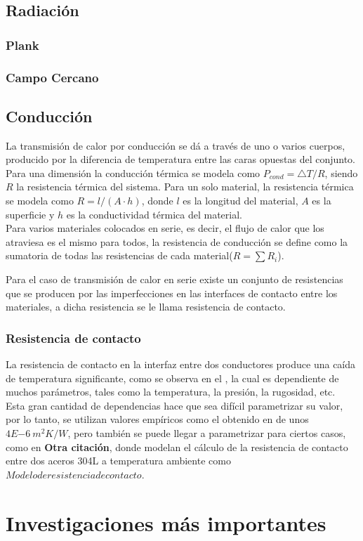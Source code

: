 \subsection{Radiación}

\subsubsection{Plank}
\subsubsection{Campo Cercano}
\subsection{Conducción}
La transmisión de calor por conducción se dá a través de uno o varios cuerpos, producido por la diferencia de temperatura entre las caras opuestas del conjunto. Para una dimensión la conducción térmica se modela como $P_{cond}={\bigtriangleup T}/{R} $, siendo $R$ la resistencia térmica del sistema.
Para un solo material, la resistencia térmica se modela como $R = l/{\left(A\cdot h\right)}$, donde $l$ es la longitud del material, $A$ es la superficie y $h$ es la conductividad térmica del material.\\

Para varios materiales colocados en serie, es decir, el flujo de calor que los atraviesa es el mismo para todos, la resistencia de conducción se define como la sumatoria de todas las resistencias de cada material($R=\sum R_i$).

Para el caso de transmisión de calor en serie existe un conjunto de resistencias que se producen por las imperfecciones en las interfaces de contacto entre los materiales, a dicha resistencia se le llama resistencia de contacto.


\subsubsection{Resistencia de contacto}
La resistencia de contacto en la interfaz entre dos conductores produce una caída de temperatura significante, como se observa en el \cite{noauthor_parallel-plate_nodate}, la cual es dependiente de muchos parámetros, tales como la temperatura, la presión, la rugosidad, etc.\\

Esta gran cantidad de dependencias hace que sea difícil parametrizar su valor, por lo tanto, se utilizan valores empíricos como el obtenido en \cite{noauthor_parallel-plate_nodate} de unos $4E{-6} \ m^2K/W$, pero también se puede llegar a parametrizar para ciertos casos, como en \textbf{Otra citación}, donde modelan el cálculo de la resistencia de contacto entre dos aceros 304L a temperatura ambiente como $Modelo de resistencia de contacto$.

\section{Investigaciones más importantes}

